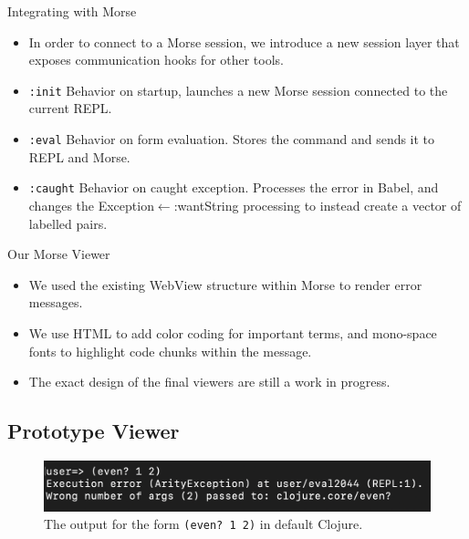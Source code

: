 \documentclass{beamer}
\begin{document}
\begin{frame}{Integrating with Morse}
  \begin{itemize}
    \item<1-> In order to connect to a Morse session, we introduce a new session layer that exposes communication hooks for other tools.
    \item<2-> \texttt{:init} Behavior on startup, launches a new Morse session connected to the current REPL.
    \item<3-> \texttt{:eval} Behavior on form evaluation. Stores the command and sends it to REPL and Morse.
    \item<4-> \texttt{:caught} Behavior on caught exception. Processes the error in Babel, and changes the Exception$\leftarrow$:wantString processing to instead create a vector of labelled pairs.  
  \end{itemize}
\end{frame}

\begin{frame}{Our Morse Viewer}
  \begin{itemize}
  \item<1-> We used the existing WebView structure within Morse to render error messages.
  \item<2-> We use HTML to add color coding for important terms, and mono-space fonts to highlight code chunks within the message.
  \item<3-> The exact design of the final viewers are still a work in progress.
  \end{itemize}
\end{frame}

\subsection{Prototype Viewer}
\begin{frame}
  \begin{figure}
    \centering
    \includegraphics[width=\textwidth]{../resources/CljDefaultEven.png}
    \caption{The output for the form \texttt{(even?~1~2)} in default Clojure. }
    \label{fig:defaultclj}
  \end{figure}
\end{frame}
\end{document}
